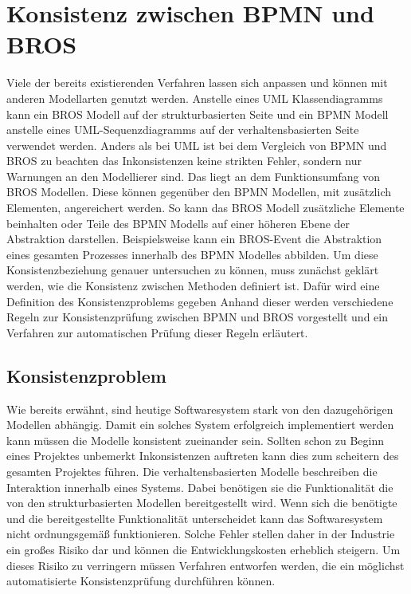 \chapter{Konsistenz zwischen BPMN und BROS}
\label{chap:consistency}

Viele der bereits existierenden Verfahren lassen sich anpassen und können mit anderen Modellarten genutzt werden. 
Anstelle eines UML Klassendiagramms kann ein BROS Modell auf der strukturbasierten Seite und ein BPMN Modell anstelle eines UML-Sequenzdiagramms auf der verhaltensbasierten Seite verwendet werden.
Anders als bei UML ist bei dem Vergleich von BPMN und BROS zu beachten das Inkonsistenzen keine strikten Fehler, sondern nur Warnungen an den Modellierer sind.
Das liegt an dem Funktionsumfang von BROS Modellen.
Diese können gegenüber den BPMN Modellen, mit zusätzlich Elementen, angereichert werden.
So kann das BROS Modell zusätzliche Elemente beinhalten oder Teile des BPMN Modells auf einer höheren Ebene der Abstraktion darstellen.
Beispielsweise kann ein BROS-Event die Abstraktion eines gesamten Prozesses innerhalb des BPMN Modelles abbilden.
Um diese Konsistenzbeziehung genauer untersuchen zu können, muss zunächst geklärt werden, wie die Konsistenz zwischen Methoden definiert ist.
Dafür wird eine Definition des Konsistenzproblems gegeben
Anhand dieser werden verschiedene Regeln zur Konsistenzprüfung zwischen BPMN und BROS vorgestellt und ein Verfahren zur automatischen Prüfung dieser Regeln erläutert.

\section{Konsistenzproblem}

Wie bereits erwähnt, sind heutige Softwaresystem stark von den dazugehörigen Modellen abhängig.
Damit ein solches System erfolgreich implementiert werden kann müssen die Modelle konsistent zueinander sein.
Sollten schon zu Beginn eines Projektes unbemerkt Inkonsistenzen auftreten kann dies zum scheitern des gesamten Projektes führen.
Die verhaltensbasierten Modelle beschreiben die Interaktion innerhalb eines Systems.
Dabei benötigen sie die Funktionalität die von den strukturbasierten Modellen bereitgestellt wird.
Wenn sich die benötigte und die bereitgestellte Funktionalität unterscheidet kann das Softwaresystem nicht ordnungsgemäß funktionieren.
Solche Fehler stellen daher in der Industrie ein großes Risiko dar und können die Entwicklungskosten erheblich steigern.
Um dieses Risiko zu verringern müssen Verfahren entworfen werden, die ein möglichst automatisierte Konsistenzprüfung durchführen können.

